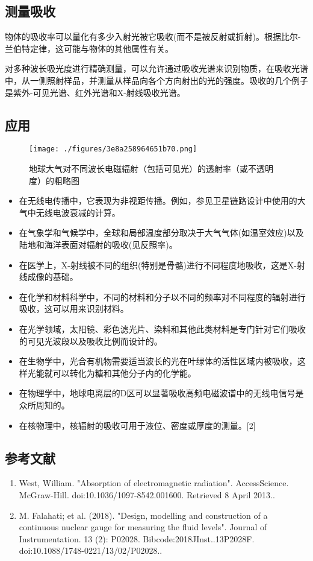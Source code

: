 \subsection{测量吸收}

物体的吸收率可以量化有多少入射光被它吸收(而不是被反射或折射)。根据比尔-兰伯特定律，这可能与物体的其他属性有关。

对多种波长吸光度进行精确测量，可以允许通过吸收光谱来识别物质，在吸收光谱中，从一侧照射样品，并测量从样品向各个方向射出的光的强度。吸收的几个例子是紫外-可见光谱、红外光谱和X-射线吸收光谱。

\subsection{应用}


\begin{figure}[ht]
\centering
\texttt{[image: ./figures/3e8a258964651b70.png]}
\caption{地球大气对不同波长电磁辐射（包括可见光）的透射率（或不透明度）的粗略图} \label{fig_XSGX_2}
\end{figure}

\begin{itemize}
\item 在无线电传播中，它表现为非视距传播。例如，参见卫星链路设计中使用的大气中无线电波衰减的计算。
\item 在气象学和气候学中，全球和局部温度部分取决于大气气体(如温室效应)以及陆地和海洋表面对辐射的吸收(见反照率)。
\item 在医学上，X-射线被不同的组织(特别是骨骼)进行不同程度地吸收，这是X-射线成像的基础。
\item 在化学和材料科学中，不同的材料和分子以不同的频率对不同程度的辐射进行吸收，这可以用来识别材料。
\item 在光学领域，太阳镜、彩色滤光片、染料和其他此类材料是专门针对它们吸收的可见光波段以及吸收比例而设计的。
\item 在生物学中，光合有机物需要适当波长的光在叶绿体的活性区域内被吸收，这样光能就可以转化为糖和其他分子内的化学能。
\item 在物理学中，地球电离层的D区可以显著吸收高频电磁波谱中的无线电信号是众所周知的。
\item 在核物理中，核辐射的吸收可用于液位、密度或厚度的测量。[2]
\end{itemize}

\subsection{参考文献}

\begin{enumerate}
\item West, William. "Absorption of electromagnetic radiation". AccessScience. McGraw-Hill. doi:10.1036/1097-8542.001600. Retrieved 8 April 2013..
\item M. Falahati; et al. (2018). "Design, modelling and construction of a continuous nuclear gauge for measuring the fluid levels". Journal of Instrumentation. 13 (2): P02028. Bibcode:2018JInst..13P2028F. doi:10.1088/1748-0221/13/02/P02028..
\end{enumerate}
